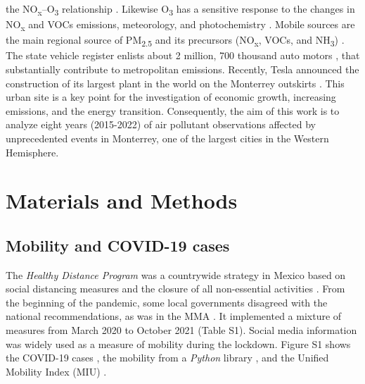 \documentclass[preprint,12pt]{elsarticle}
\begin{document}
the NO\textsubscript{x}--O\textsubscript{3} relationship \citep{Menchaca_Torre_2015a}. Likewise O\textsubscript{3} has a sensitive response to the changes in NO\textsubscript{x} and VOCs emissions, meteorology, and photochemistry \citep{Hern_ndez_Paniagua_2017}. Mobile sources are the main regional source of PM\textsubscript{2.5} and its precursors (NO\textsubscript{x}, VOCs, and NH\textsubscript{3}) \citep{Martínez-Cinco2016}. The state vehicle register enlists about 2 million, 700 thousand auto motors \citep{len}, that substantially contribute to metropolitan emissions. Recently, Tesla announced the construction of its largest plant in the world on the Monterrey outskirts \citep{tesla_2023}. This urban site is a key point for the investigation of economic growth, increasing emissions, and the energy transition. Consequently, the aim of this work is to analyze eight years (2015-2022) of air pollutant observations affected by unprecedented events in Monterrey, one of the largest cities in the Western Hemisphere.
\section*{Materials and Methods}
\subsection*{Mobility and COVID-19 cases}
The \emph{Healthy Distance Program} was a countrywide strategy in Mexico based on social distancing measures and the closure of all non-essential activities \citep{covid-19a}. From the beginning of the pandemic, some local governments disagreed with the national recommendations, as was in the MMA \citep{state}. It implemented a mixture of measures from March 2020 to October 2021 (Table S1). Social media information was widely used as a measure of mobility during the lockdown. Figure S1 shows the COVID-19 cases \citep{covid19mex}, the mobility from a \emph{Python} library \citep{Graff_2022}, and the Unified Mobility Index (MIU) \citep{conacyt}.
\end{document}
